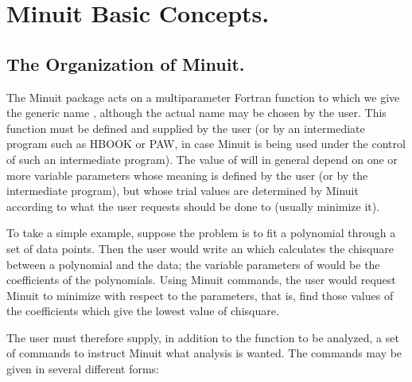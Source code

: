  
\chapter{Minuit Basic Concepts.}

\section{The Organization of Minuit.}
The Minuit package acts on a multiparameter Fortran function to which we
give the generic name , although the actual name may be chosen by the user.
This function must be defined and supplied by the user (or by an intermediate
program such as HBOOK\cite{bib-HBOOK} or PAW\cite{bib-PAW}, 
in case Minuit is being used under the
control of such an intermediate program).
The value of  will in general depend on one or more variable parameters
whose meaning is defined by the user (or by the intermediate program),
but whose trial values are determined by Minuit according to what the user
requests should be done to  (usually minimize it).
 
To take a simple example, suppose the problem is to fit a polynomial through
a set of data points.
Then the user would write an  which calculates the chisquare between a
polynomial and the data; the variable parameters of  would be the
coefficients of the polynomials.  Using Minuit commands, the user would request
Minuit to minimize  with respect to the parameters, that is, find those
values of the coefficients which give the lowest value of chisquare.
 
The user must therefore supply, in addition to the function to be analyzed,
a set of commands to instruct Minuit what analysis is wanted.
The commands may be given in several different forms:

